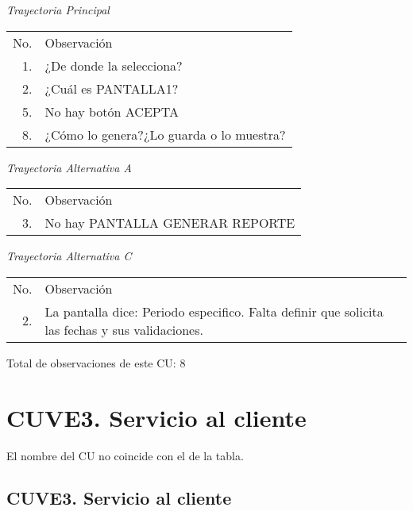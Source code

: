 \documentclass[10pt,spanish]{article}
\providecommand{\tabularnewline}{\\}
\begin{document}


\textit{\large Trayectoria Principal}{\large {} }{\large \par}

\begin{longtable}{rp{8cm}}
No.  & Observación\tabularnewline
1.  & ¿De donde la selecciona?\tabularnewline
2.  & ¿Cuál es PANTALLA1?\tabularnewline
5.  & No hay botón ACEPTA \tabularnewline
8.  & ¿Cómo lo genera?¿Lo guarda o lo muestra?\tabularnewline
\end{longtable}

\textit{Trayectoria Alternativa A}

\begin{longtable}{rp{8cm}}
No.  & Observación\tabularnewline
3.  &  No hay PANTALLA GENERAR REPORTE\tabularnewline
\end{longtable}

\textit{Trayectoria Alternativa C}

\begin{longtable}{rp{8cm}}
No.  & Observación\tabularnewline
2. & La pantalla dice: Periodo especifico. Falta definir que solicita las fechas y sus validaciones.\tabularnewline
\end{longtable}

Total de observaciones de este CU: 8
\newpage{} 


\section{CUVE3. Servicio al cliente}

El nombre del CU no coincide con el de la tabla. 

\subsection{CUVE3. Servicio al cliente}

\end{document}
